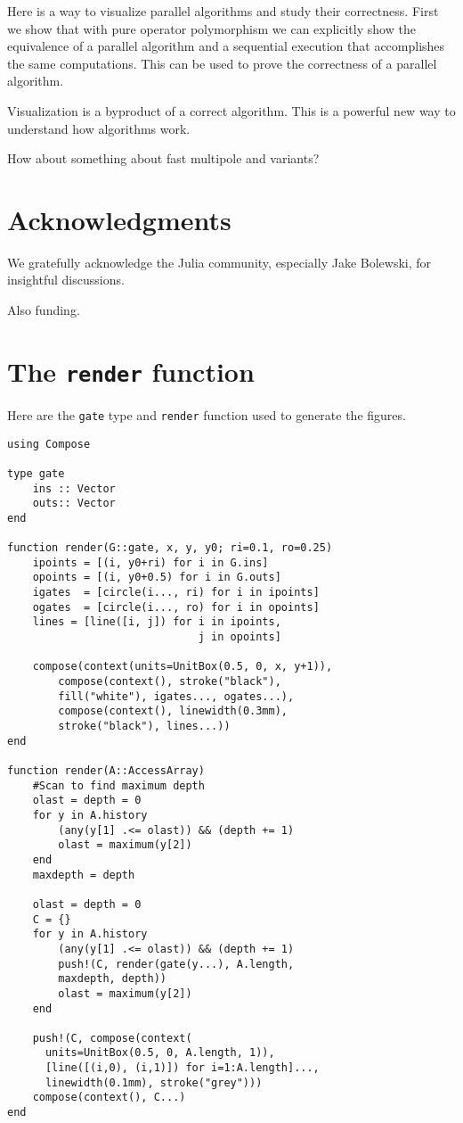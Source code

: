 \documentclass{sig-alternate}
\newcommand{\code}[1]{\texttt{#1}}
\begin{document}
Here is a way to visualize parallel algorithms and study their correctness. First we show that with pure operator polymorphism we can explicitly show the equivalence of a parallel algorithm and a sequential execution that accomplishes the same computations. This can be used to prove the correctness of a parallel algorithm.

Visualization is a byproduct of a correct algorithm. This is a powerful new way to understand how algorithms work.

How about something about fast multipole and variants?

\section{Acknowledgments}
We gratefully acknowledge the Julia community, especially Jake Bolewski, for insightful discussions.

Also funding.




\appendix

\section{The \code{render} function}

Here are the \code{gate} type and \code{render} function used to generate the figures.

\begin{verbatim}
using Compose

type gate
    ins :: Vector
    outs:: Vector
end

function render(G::gate, x, y, y0; ri=0.1, ro=0.25)
    ipoints = [(i, y0+ri) for i in G.ins]
    opoints = [(i, y0+0.5) for i in G.outs]
    igates  = [circle(i..., ri) for i in ipoints]
    ogates  = [circle(i..., ro) for i in opoints]
    lines = [line([i, j]) for i in ipoints,
                              j in opoints]

    compose(context(units=UnitBox(0.5, 0, x, y+1)),
        compose(context(), stroke("black"),
	    fill("white"), igates..., ogates...),
        compose(context(), linewidth(0.3mm),
	    stroke("black"), lines...))
end

function render(A::AccessArray)
    #Scan to find maximum depth
    olast = depth = 0
    for y in A.history
        (any(y[1] .<= olast)) && (depth += 1)
        olast = maximum(y[2])
    end
    maxdepth = depth
    
    olast = depth = 0
    C = {}
    for y in A.history
        (any(y[1] .<= olast)) && (depth += 1)
        push!(C, render(gate(y...), A.length,
	    maxdepth, depth))
        olast = maximum(y[2])
    end
    
    push!(C, compose(context(
      units=UnitBox(0.5, 0, A.length, 1)),
      [line([(i,0), (i,1)]) for i=1:A.length]...,
      linewidth(0.1mm), stroke("grey")))
    compose(context(), C...)
end
\end{verbatim}
\end{document}
